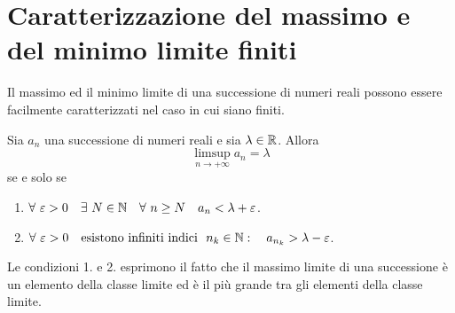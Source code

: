 \section{Caratterizzazione del massimo e del minimo limite finiti}
Il massimo ed il minimo limite di una successione di numeri reali possono essere facilmente caratterizzati nel caso in cui siano finiti.
\begin{proposition}
Sia $a_n$ una successione di numeri reali e sia $\lambda \in \mathbb{R}$. Allora
\begin{equation*}
	\limsup_{n\to +\infty} a_n =\lambda
\end{equation*}
se e solo se
\begin{enumerate}
	\item $\forall \ \varepsilon>0 \quad \exists \ N\in \mathbb{N}\quad \forall \ n\geq N \quad a_n<\lambda +\varepsilon$.
	\item $\forall \ \varepsilon>0 \quad \mbox{esistono infiniti indici }\ n_k\in \mathbb{N}:\quad a_{n_k}>\lambda-\varepsilon$.
\end{enumerate}
\end{proposition}
\begin{observe}
Le condizioni 1. e 2. esprimono il fatto che il massimo limite di una successione è un elemento della classe limite ed è il più grande tra gli elementi della classe limite.
\end{observe}
